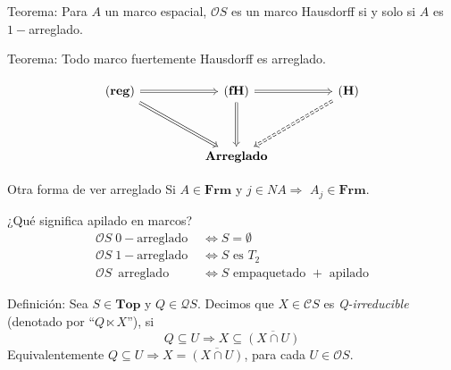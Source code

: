 \documentclass[compress,12pt]{beamer}
\begin{document}
\begin{frame}
\begin{block}{Teorema:}
        Para $A$ un marco espacial, $\mathcal{O}S$ es un marco Hausdorff si y solo si $A$ es $1-$arreglado.
    \end{block}

\begin{block}{Teorema:}
    Todo marco fuertemente Hausdorff es arreglado.
\end{block}

\[\begin{tikzcd}
	{\mathbf{(reg)}} && {\mathbf{(fH)}} && {\mathbf{(H)}} \\
	\\
	&& {\mathbf{Arreglado}}
	\arrow[Rightarrow, from=1-1, to=1-3]
	\arrow[Rightarrow, from=1-1, to=3-3]
	\arrow[Rightarrow, from=1-3, to=1-5]
	\arrow[Rightarrow, from=1-3, to=3-3]
	\arrow[Rightarrow, dashed, from=1-5, to=3-3]
\end{tikzcd}\]
\end{frame}

\begin{frame}{Otra forma de ver arreglado}
Si $A\in \mathbf{Frm}$ y $j\in NA\Rightarrow$ $A_j\in \mathbf{Frm}$.

\end{frame}

\begin{frame}{¿Qué significa apilado en marcos?}
	\[
		\begin{split}
			\mathcal{O}S\; 0-\mbox{arreglado }& \Leftrightarrow S=\emptyset\\
			\mathcal{O}S\; 1-\mbox{arreglado }& \Leftrightarrow S \mbox{ es } T_2\\
			\mathcal{O}S\, \mbox{ arreglado }& \Leftrightarrow S \mbox{ empaquetado }+ \mbox{ apilado}
		\end{split}
	\]

	\begin{block}{Definición:}
		Sea $S\in \mathbf{Top}$ y $Q\in \mathcal{Q}S$. Decimos que $X\in \mathcal{C}S$ es \emph{Q-irreducible} (denotado por ``$Q\ltimes X$''), si
		\[
		Q\subseteq U\Rightarrow X\subseteq \overline{(X\cap U)}
		\]
		Equivalentemente $Q\subseteq U\Rightarrow X=\overline{(X\cap U)}$, para cada $U\in \mathcal{O}S$.
	\end{block}
\end{frame}
\end{document}
